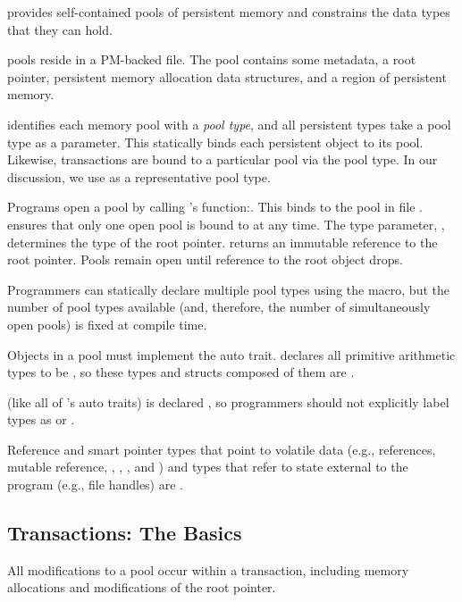 \This{} provides self-contained pools of persistent memory and constrains the
data types that they can hold.

 \This{} pools reside in a
PM-backed file.  The pool contains some metadata, a root pointer, persistent
memory allocation data structures, and a region of persistent memory.

\This{} identifies each memory pool with a \emph{pool type}, and all persistent
types take a pool type as a parameter.  This statically binds each persistent
object to its pool.  Likewise, transactions are bound to a particular pool via
the pool type.  In our discussion, we use  as a representative pool
type.

Programs open a pool by calling 's  function:\linebreak{}.  This binds  to the pool in file
.  \This{} ensures that only one open pool is bound to  at
any time.  The type parameter, , determines the type of the root
pointer.   returns an immutable reference to the root pointer.  Pools remain
open until reference to the root object drops.

Programmers can statically declare multiple pool types using the
 macro, but the number of pool types available (and,
therefore, the number of simultaneously open pools) is fixed at compile time.

 Objects in a pool must implement the
 auto trait.  \This{} declares all primitive arithmetic types to be
, so these types and structs composed of them are .

 (like all of \this{}'s auto traits) is declared
, so programmers should not explicitly label types as 
or .

Reference and smart pointer types that point to volatile data (e.g.,
references, mutable reference, , , , and
) and types that refer to state external to the program (e.g., file
handles) are .



\subsection{Transactions: The Basics}

All modifications to a \this{} pool occur within a transaction, including
memory allocations and modifications of the root pointer.

